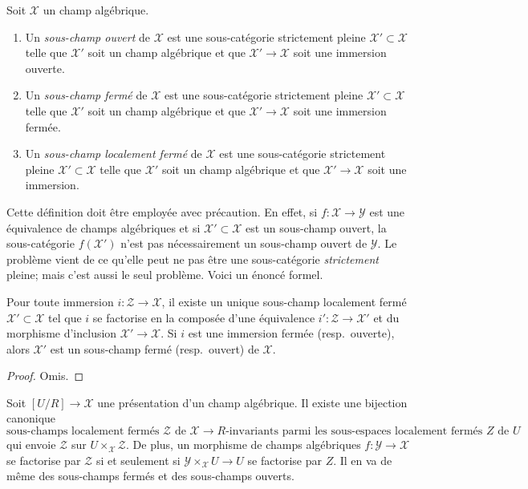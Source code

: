 \begin{definition}
\label{definition-substacks}
Soit $\mathcal{X}$ un champ algébrique.
\begin{enumerate}
\item Un {\it sous-champ ouvert} de $\mathcal{X}$ est une sous-catégorie strictement pleine
$\mathcal{X}' \subset \mathcal{X}$ telle que $\mathcal{X}'$ soit un champ
algébrique et que $\mathcal{X}' \to \mathcal{X}$ soit une immersion ouverte.
\item Un {\it sous-champ fermé} de $\mathcal{X}$ est une sous-catégorie strictement pleine
$\mathcal{X}' \subset \mathcal{X}$ telle que $\mathcal{X}'$ soit un champ
algébrique et que $\mathcal{X}' \to \mathcal{X}$ soit une immersion fermée.
\item Un {\it sous-champ localement fermé} de $\mathcal{X}$ est une sous-catégorie
strictement pleine $\mathcal{X}' \subset \mathcal{X}$ telle que $\mathcal{X}'$
soit un champ algébrique et que $\mathcal{X}' \to \mathcal{X}$ soit une immersion.
\end{enumerate}
\end{definition}

\noindent
Cette définition doit être employée avec précaution. En effet, si
$f : \mathcal{X} \to \mathcal{Y}$ est une équivalence de champs algébriques
et si $\mathcal{X}' \subset \mathcal{X}$ est un sous-champ ouvert, la sous-catégorie
$f(\mathcal{X}')$ n'est pas nécessairement un sous-champ ouvert de $\mathcal{Y}$.
Le problème vient de ce qu'elle peut ne pas être une sous-catégorie {\it strictement}
pleine; mais c'est aussi le seul problème.
Voici un énoncé formel.

\begin{lemma}
\label{lemma-substack-image}
Pour toute immersion $i : \mathcal{Z} \to \mathcal{X}$, il existe un
unique sous-champ localement fermé $\mathcal{X}' \subset \mathcal{X}$
tel que $i$ se factorise en la composée d'une
équivalence $i' : \mathcal{Z} \to \mathcal{X}'$
et du morphisme d'inclusion $\mathcal{X}' \to \mathcal{X}$.
Si $i$ est une immersion fermée (resp.\ ouverte), alors $\mathcal{X}'$
est un sous-champ fermé (resp.\ ouvert) de $\mathcal{X}$.
\end{lemma}

\begin{proof}
Omis.
\end{proof}

\begin{lemma}
\label{lemma-substacks-presentation}
Soit $[U/R] \to \mathcal{X}$ une présentation d'un champ algébrique.
Il existe une bijection canonique
$$
\text{sous-champs localement fermés }\mathcal{Z}\text{ de }\mathcal{X}
\longrightarrow
R\text{-invariants parmi les sous-espaces localement fermés }Z\text{ de }U
$$
qui envoie $\mathcal{Z}$ sur $U \times_\mathcal{X} \mathcal{Z}$.
De plus, un morphisme de champs algébriques $f : \mathcal{Y} \to \mathcal{X}$
se factorise par $\mathcal{Z}$ si et seulement si
$\mathcal{Y} \times_\mathcal{X} U \to U$ se factorise par $Z$.
Il en va de même des sous-champs fermés et des sous-champs ouverts.
\end{lemma}

